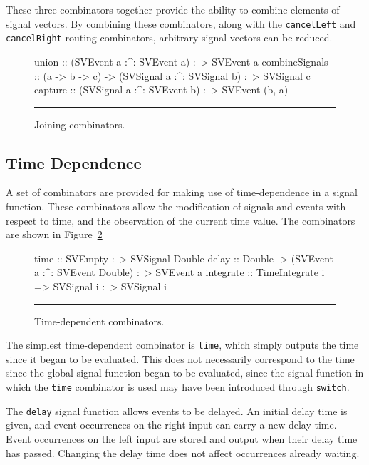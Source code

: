 These three combinators together provide the ability to combine elements of
signal vectors. By combining these combinators, along with the {\tt cancelLeft}
and {\tt cancelRight} routing combinators, arbitrary signal vectors can be
reduced.

\begin{figure}
\begin{code}
union          :: (SVEvent a :^: SVEvent a) :~> SVEvent a
combineSignals :: (a -> b -> c) -> (SVSignal a :^: SVSignal b) :~> SVSignal c
capture        :: (SVSignal a :^: SVEvent b) :~> SVEvent (b, a)
\end{code}
\hrule
\caption{Joining combinators.}
\label{figure:joining_combinators}
\end{figure}

\subsection{Time Dependence}
\label{subsection:System_Design_and_Interface-Signal_Functions-Time_Dependence}

A set of combinators are provided for making use of time-dependence in a signal
function. These combinators allow the modification of signals and events with
respect to time, and the observation of the current time value. The combinators
are shown in Figure~\ref{figure:time_combinators}

\begin{figure}
\begin{code}
time      :: SVEmpty :~> SVSignal Double
delay     :: Double -> (SVEvent a :^: SVEvent Double) :~> SVEvent a
integrate :: TimeIntegrate i => SVSignal i :~> SVSignal i
\end{code}
\hrule
\caption{Time-dependent combinators.}
\label{figure:time_combinators}
\end{figure}

The simplest time-dependent combinator is {\tt time}, which simply outputs
the time since it began to be evaluated. This does not necessarily correspond to
the time since the global signal function began to be evaluated, since the
signal function in which the {\tt time} combinator is used may have been
introduced through {\tt switch}.

The {\tt delay} signal function allows events to be delayed. An initial delay
time is given, and event occurrences on the right input can carry a new delay
time. Event occurrences on the left input are stored and output when their delay
time has passed. Changing the delay time does not affect occurrences already
waiting.

